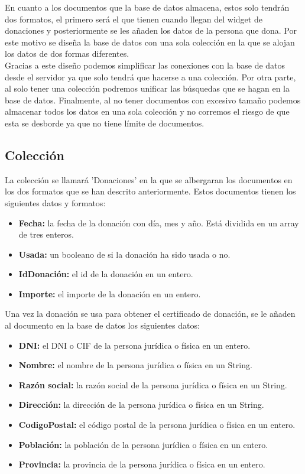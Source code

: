 En cuanto a los documentos que la base de datos almacena, estos solo tendrán dos formatos, el primero será el que tienen cuando llegan del widget de donaciones y posteriormente se les añaden los datos de la persona que dona. Por este motivo se diseña la base de datos con una sola colección en la que se alojan los datos de dos formas diferentes.\\

Gracias a este diseño podemos simplificar las conexiones con la base de datos desde el servidor ya que solo tendrá que hacerse a una colección. Por otra parte, al solo tener una colección podremos unificar las búsquedas que se hagan en la base de datos. Finalmente, al no tener documentos con excesivo tamaño podemos almacenar todos los datos en una sola colección y no corremos el riesgo de que esta se desborde ya que no tiene límite de documentos.

\subsection{Colección}

La colección se llamará 'Donaciones' en la que se albergaran los documentos en los dos formatos que se han descrito anteriormente. Estos documentos tienen los siguientes datos y formatos:

\begin{itemize}
	\item \textbf{Fecha:} la fecha de la donación con día, mes y año. Está dividida en un array de tres enteros.
	\item \textbf{Usada:} un booleano de si la donación ha sido usada o no.
	\item \textbf{IdDonación:} el id de la donación en un entero.
	\item \textbf{Importe:} el importe de la donación en un entero.
\end{itemize}

Una vez la donación se usa para obtener el certificado de donación, se le añaden al documento en la base de datos los siguientes datos:

\begin{itemize}
	\item \textbf{DNI:} el DNI o CIF de la persona jurídica o física en un entero.
	\item \textbf{Nombre:} el nombre de la persona jurídica o física en un String.
	\item \textbf{Razón social:} la razón social de la persona jurídica o física en un String.
	\item \textbf{Dirección:} la dirección de la persona jurídica o física en un String.
	\item \textbf{CodigoPostal:} el código postal de la persona jurídica o física en un entero.
	\item \textbf{Población:} la población de la persona jurídica o física en un entero.
	\item \textbf{Provincia:} la provincia de la persona jurídica o física en un entero.
\end{itemize}


